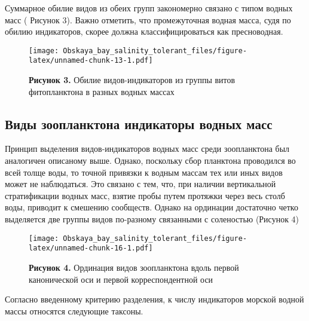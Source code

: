 \documentclass[
]{article}
\begin{document}
Суммарное обилие видов из обеих групп закономерно связано с типом водных
масс ( Рисунок 3). Важно отметить, что промежуточная водная масса, судя
по обилию индикаторов, скорее должна классифицироваться как
пресноводная.

\begin{figure}
\centering
\texttt{[image: Obskaya\_bay\_salinity\_tolerant\_files/figure-latex/unnamed-chunk-13-1.pdf]}
\caption{\textbf{Рисунок 3.} Обилие видов-индикаторов из группы витов
фитопланктона в разных водных массах}
\end{figure}

\hypertarget{ux432ux438ux434ux44b-ux437ux43eux43eux43fux43bux430ux43dux43aux442ux43eux43dux430-ux438ux43dux434ux438ux43aux430ux442ux43eux440ux44b-ux432ux43eux434ux43dux44bux445-ux43cux430ux441ux441}{%
\subsection{Виды зоопланктона индикаторы водных
масс}\label{ux432ux438ux434ux44b-ux437ux43eux43eux43fux43bux430ux43dux43aux442ux43eux43dux430-ux438ux43dux434ux438ux43aux430ux442ux43eux440ux44b-ux432ux43eux434ux43dux44bux445-ux43cux430ux441ux441}}

Принцип выделения видов-индикаторов водных масс среди зоопланктона был
аналогичен описаному выше. Однако, поскольку сбор планктона проводился
во всей толще воды, то точной привязки к водным массам тех или иных
видов может не наблюдаться. Это связано с тем, что, при наличии
вертикальной стратификации водных масс, взятие пробы путем протяжки
через весь столб воды, приводит к смешению сообществ. Однако на
ординации достаточно четко выделяется две группы видов по-разному
связанными с соленостью (Рисунок 4)

\begin{figure}
\centering
\texttt{[image: Obskaya\_bay\_salinity\_tolerant\_files/figure-latex/unnamed-chunk-16-1.pdf]}
\caption{\textbf{Рисунок 4.} Ординация видов зоопланктона вдоль первой
канонической оси и первой корреспондентной оси}
\end{figure}

Согласно введенному критерию разделения, к числу индикаторов морской
водной массы относятся следующие таксоны.
\end{document}
